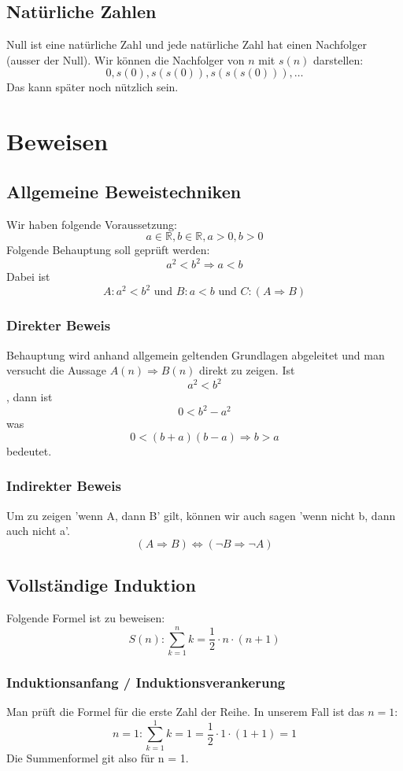 \subsection{Natürliche Zahlen}
  Null ist eine natürliche Zahl und jede natürliche Zahl hat einen
    Nachfolger (ausser der Null).
  Wir können die Nachfolger von $n$ mit $s(n)$ darstellen:
  \[ 0, s(0), s(s(0)), s(s(s(0))), \dots \]
  Das kann später noch nützlich sein.

\section{Beweisen}
\subsection{Allgemeine Beweistechniken}
Wir haben folgende Voraussetzung:
  \[ a \in \mathbb{R}, b \in \mathbb{R}, a > 0, b > 0 \]
  Folgende Behauptung soll geprüft werden:
  \[ a^2 < b^2 \Rightarrow a < b \]
  Dabei ist
  \[ A: a^2 < b^2 \text{ und } B: a < b \text{ und } C: (A \Rightarrow B) \]
  \subsubsection{Direkter Beweis}
  Behauptung wird anhand allgemein geltenden Grundlagen abgeleitet und man versucht die Aussage $A(n) \Rightarrow B(n)$ direkt zu zeigen.
  Ist \[a^2 < b^2\], dann ist \[0 < b^2 - a^2\] was \[0 < (b + a)(b - a)
  \Rightarrow b > a\] bedeutet.
  \subsubsection{Indirekter Beweis}
  Um zu zeigen 'wenn A, dann B' gilt, können wir auch sagen 'wenn nicht b, dann auch nicht a'.
  \[ (A \Rightarrow B) \Leftrightarrow (\neg B \Rightarrow \neg A) \]

\subsection{Vollständige Induktion}
Folgende Formel ist zu beweisen:
\[ S(n): \sum\limits_{k=1}^n k = \frac{1}{2} \cdot n \cdot (n + 1)\]
\subsubsection{Induktionsanfang / Induktionsverankerung}
Man prüft die Formel für die erste Zahl der Reihe. In unserem Fall ist
das $n = 1$:
\[ n = 1: \sum\limits_{k=1}^1 k = 1 = \frac{1}{2} \cdot 1 \cdot (1 + 1) = 1\]
Die Summenformel git also für n = 1.

